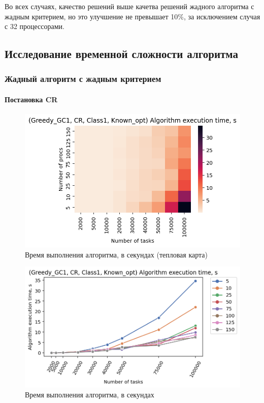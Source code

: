 Во всех случаях, качество решений выше качетва решений жадного алгоритма с жадным критерием, но это улучшение не превышает 10\%, за исключением случая с 32 процессорами.

\subsection{Исследование временной сложности алгоритма}

\subsubsection{Жадный алгоритм с жадным критерием}

\paragraph{Постановка CR}

\begin{figure}[!htbp]
    \centering
    \includegraphics[width=\textwidth]{imgs/ideal_1/CR/et_heatmap.png}
    \caption{Время выполнения алгоритма, в секундах (тепловая карта)}
    \label{fig:CR-exec-time-heatmap}
\end{figure}

\begin{figure}[!htbp]
    \centering
    \includegraphics[width=\textwidth]{imgs/ideal_1/CR/tr_graph.png}
    \caption{Время выполнения алгоритма, в секундах}
    \label{fig:CR-exec-time-compiled}
\end{figure}


